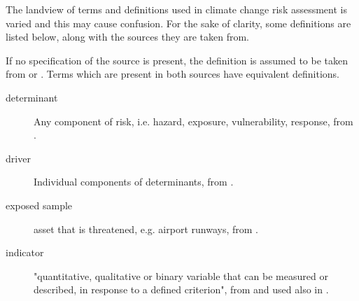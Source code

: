 The landview of terms and definitions used in climate change risk assessment is varied and this may cause confusion. For the sake of clarity, some definitions are listed below, along with the sources they are taken from.

If no specification of the source is present, the definition is assumed to be taken from \cite{2021ISO14091} or \cite{2021MatthewsAnnexVII}. Terms which are present in both sources have equivalent definitions.

\begin{description}
  \item[determinant] Any component of risk, i.e. hazard, exposure, vulnerability, response, from \cite[493]{2023SimpsonAdaptationTo}.
  \item[driver] Individual components of determinants, from \cite[493]{2023SimpsonAdaptationTo}.
  \item[exposed sample] asset that is threatened, e.g. airport runways, from \cite[553]{2022DeVivoRiskAssessment}.
  \item[indicator] "quantitative, qualitative or binary variable that can be measured or described, in response to a defined criterion", from \cite{2021ISO14091} and used also in \cite{2022DeVivoRiskAssessment,2023DeVivoApplicationOf,2023DeVivoClimate-RiskAssessment}.
\end{description}
